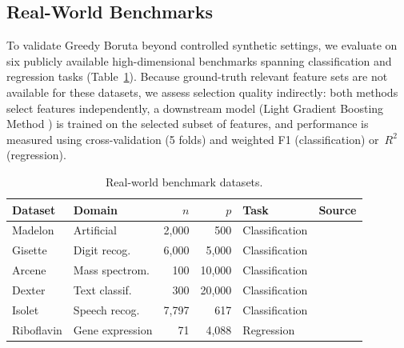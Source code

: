 \documentclass[runningheads]{llncs}
\begin{document}
 
\subsection{Real-World Benchmarks}
\label{sec:experiments:realworld}
 
To validate Greedy Boruta beyond controlled synthetic settings, we evaluate on six publicly available high-dimensional benchmarks spanning classification and regression tasks (Table~\ref{tab:realworld_datasets}). Because ground-truth relevant feature sets are not available for these datasets, we assess selection quality indirectly: both methods select features independently, a downstream model (Light Gradient Boosting Method \cite{ke2017lightgbm}) is trained on the selected subset of features, and performance is measured using cross-validation (5 folds) and weighted F1 (classification) or~$R^2$ (regression). 

 
\begin{table}[H]
\centering
\caption{Real-world benchmark datasets.}
\label{tab:realworld_datasets}
\begin{tabular}{llrrll}
\toprule
Dataset    & Domain          & $n$    & $p$      & Task           & Source \\
\midrule
Madelon    & Artificial      & 2{,}000  & 500      & Classification & \cite{guyon2004result} \\
Gisette    & Digit recog.    & 6{,}000  & 5{,}000  & Classification & \cite{guyon2004result} \\
Arcene     & Mass spectrom.  & 100      & 10{,}000 & Classification & \cite{guyon2004result} \\
Dexter     & Text classif.   & 300      & 20{,}000 & Classification & \cite{guyon2004result} \\
Isolet     & Speech recog.   & 7{,}797  & 617      & Classification & \cite{uci2017} \\
Riboflavin & Gene expression & 71       & 4{,}088  & Regression     & \cite{buhlmann2014hdi} \\
\bottomrule
\end{tabular}
\end{table}
\end{document}
